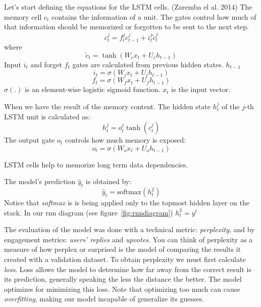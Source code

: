 \documentclass{article} %
\begin{document}
Let's start defining the equations for the LSTM cells. (Zaremba el al. 2014)
The memory cell $c_t$ contains the information of a unit. The gates control how
much of that information should be memorized or forgotten to be sent to the next
step.
\begin{equation}
c^j_t = f^j_t c^j_{t-1} + i^j_t \widetilde{c}^j_t
\end{equation}
where
\begin{equation}
\widetilde{c}_t = \tanh{(W_c x_t + U_c h_{t-1})}
\end{equation}
Input $i_t$ and forget $f_t$ gates are calculated from previous hidden states.
$h_{t-1}$
\begin{equation}
i_t = \sigma{(W_i x_t + U_i h_{t-1})}
\end{equation}
\begin{equation}
f_t = \sigma{(W_f x_t + U_f h_{t-1})}
\end{equation}
$\sigma{(.)}$ is an element-wise logistic sigmoid function. $x_t$ is the input
vector.

When we have the result of the memory content. The hidden state $h^j_t$ of the
$j$-th LSTM unit is calculated as:
\begin{equation}
h^j_t = o^j_t \tanh{(c^j_t)}
\end{equation}
The output gate $o_t$ controls how much memory is exposed:
\begin{equation}
o_t = \sigma{(W_o x_t + U_o h_{t-1})}
\end{equation}

LSTM cells help to memorize long term data dependencies.

The model's prediction $\hat{y}_t$ is obtained by:
\begin{equation}
\hat{y}_t = \textrm{softmax} (h^2_t)
\end{equation}
Notice that \textit{softmax} is is being applied only to the topmost hidden
layer on the stack.  In our rnn diagram (see figure~\ref{fig:rnndiagram}) $h^2_t
= y^t$

The evaluation of the model was done with a technical metric:
\textit{perplexity}, and by engagement metrics: \textit{users' replies} and
\textit{upvotes}. You can think of perplexity as a measure of how perplex or
surprised is the model of comparing the results it created with a validation
dataset. To obtain perplexity we must first calculate \textit{loss}. Loss allows
the model to determine how far away from the correct result is its
prediction, generally speaking the less the distance the better. The model
optimizes for minimizing this loss. Note that optimizing too much can cause
\textit{overfitting}, making our model incapable of generalize its guesses.
\end{document}
